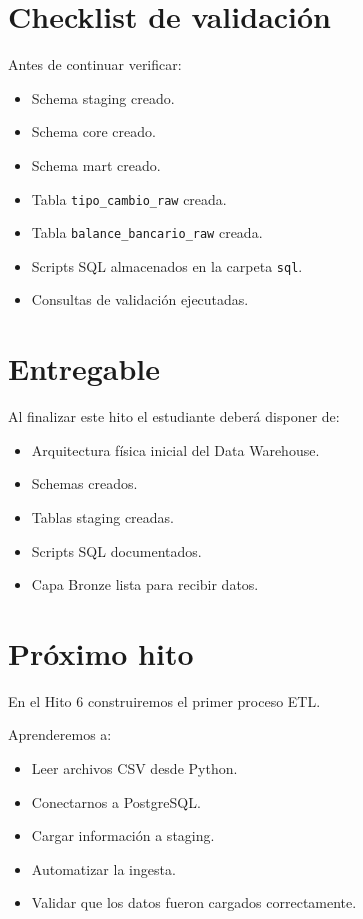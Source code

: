 \section{Checklist de validación}

Antes de continuar verificar:

\begin{itemize}
\item[$\Box$] Schema staging creado.
\item[$\Box$] Schema core creado.
\item[$\Box$] Schema mart creado.
\item[$\Box$] Tabla \texttt{tipo\_cambio\_raw} creada.
\item[$\Box$] Tabla \texttt{balance\_bancario\_raw} creada.
\item[$\Box$] Scripts SQL almacenados en la carpeta \texttt{sql}.
\item[$\Box$] Consultas de validación ejecutadas.
\end{itemize}

\section{Entregable}

Al finalizar este hito el estudiante deberá disponer de:

\begin{itemize}
\item Arquitectura física inicial del Data Warehouse.
\item Schemas creados.
\item Tablas staging creadas.
\item Scripts SQL documentados.
\item Capa Bronze lista para recibir datos.
\end{itemize}

\section{Próximo hito}

En el Hito 6 construiremos el primer proceso ETL.

Aprenderemos a:

\begin{itemize}
\item Leer archivos CSV desde Python.
\item Conectarnos a PostgreSQL.
\item Cargar información a staging.
\item Automatizar la ingesta.
\item Validar que los datos fueron cargados correctamente.
\end{itemize}
